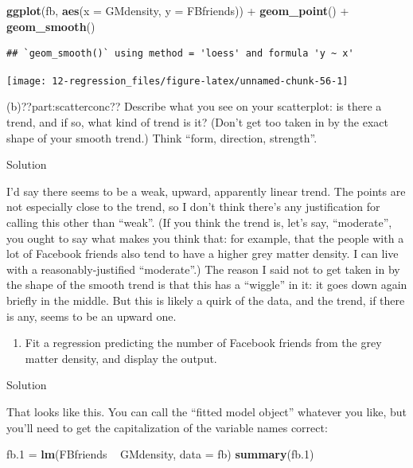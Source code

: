 \documentclass[]{tufte-book}
\newenvironment{Shaded}{}{}
\newcommand{\DataTypeTok}[1]{\textcolor[rgb]{0.56,0.13,0.00}{#1}}
\newcommand{\FloatTok}[1]{\textcolor[rgb]{0.25,0.63,0.44}{#1}}
\newcommand{\KeywordTok}[1]{\textcolor[rgb]{0.00,0.44,0.13}{\textbf{#1}}}
\newcommand{\NormalTok}[1]{#1}
\newcommand{\OperatorTok}[1]{\textcolor[rgb]{0.40,0.40,0.40}{#1}}
\newcommand{\StringTok}[1]{\textcolor[rgb]{0.25,0.44,0.63}{#1}}
\providecommand{\tightlist}{%
  \setlength{\itemsep}{0pt}\setlength{\parskip}{0pt}}
\theoremstyle{definition}
\theoremstyle{definition}
\theoremstyle{definition}
\theoremstyle{remark}
\begin{document}
\begin{Shaded}
\begin{Highlighting}[]
\KeywordTok{ggplot}\NormalTok{(fb, }\KeywordTok{aes}\NormalTok{(}\DataTypeTok{x =}\NormalTok{ GMdensity, }\DataTypeTok{y =}\NormalTok{ FBfriends)) }\OperatorTok{+}\StringTok{ }
\StringTok{    }\KeywordTok{geom_point}\NormalTok{() }\OperatorTok{+}\StringTok{ }\KeywordTok{geom_smooth}\NormalTok{()}
\end{Highlighting}
\end{Shaded}

\begin{verbatim}
## `geom_smooth()` using method = 'loess' and formula 'y ~ x'
\end{verbatim}

\texttt{[image: 12-regression\_files/figure-latex/unnamed-chunk-56-1]}

(b)??part:scatterconc?? Describe what you see on your scatterplot: is
there a trend, and if so, what kind of trend is it? (Don't get too taken
in by the exact shape of your smooth trend.) Think ``form, direction,
strength''.

Solution

I'd say there seems to be a weak, upward, apparently linear trend. The
points are not especially close to the trend, so I don't think there's
any justification for calling this other than ``weak''. (If you think
the trend is, let's say, ``moderate'', you ought to say what makes you
think that: for example, that the people with a lot of Facebook friends
also tend to have a higher grey matter density. I can live with a
reasonably-justified ``moderate''.) The reason I said not to get taken
in by the shape of the smooth trend is that this has a ``wiggle'' in it:
it goes down again briefly in the middle. But this is likely a quirk of
the data, and the trend, if there is any, seems to be an upward one.

\begin{enumerate}
\def\labelenumi{(\alph{enumi})}
\setcounter{enumi}{2}
\tightlist
\item
  Fit a regression predicting the number of Facebook friends from the
  grey matter density, and display the output.
\end{enumerate}

Solution

That looks like this. You can call the ``fitted model object'' whatever
you like, but you'll need to get the capitalization of the variable
names correct:

\begin{Shaded}
\begin{Highlighting}[]
\NormalTok{fb}\FloatTok{.1}\NormalTok{ =}\StringTok{ }\KeywordTok{lm}\NormalTok{(FBfriends }\OperatorTok{~}\StringTok{ }\NormalTok{GMdensity, }\DataTypeTok{data =}\NormalTok{ fb)}
\KeywordTok{summary}\NormalTok{(fb}\FloatTok{.1}\NormalTok{)}
\end{Highlighting}
\end{Shaded}
\end{document}
